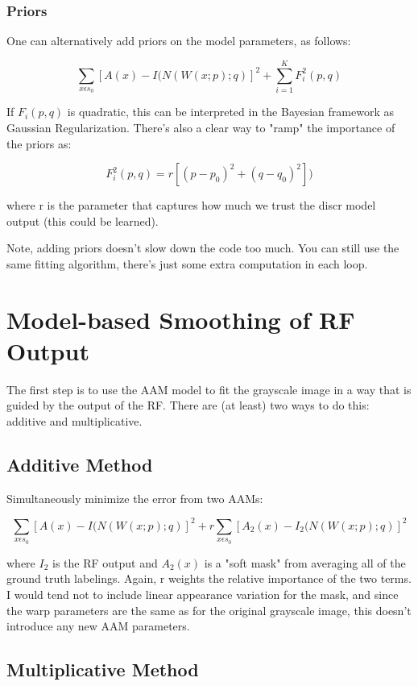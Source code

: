 \documentclass[10pt,twocolumn,letterpaper]{article}
\begin{document}
\subsubsection{Priors}

One can alternatively add priors on the model parameters, as follows:

\[ \sum_{x \epsilon s_0} [A(x) - I(N(W(x;p);q)]^2 + \sum_{i=1}^K F_i^2(p,q) \]

If $F_i(p,q)$ is quadratic, this can be interpreted in the Bayesian framework as Gaussian Regularization.  There's also a clear way to "ramp" the importance of the priors as:

\[ F_i^2(p,q) = r[(p-p_0)^2+(q-q_0)^2]) \]

where r is the parameter that captures how much we trust the discr model output (this could be learned).

Note, adding priors doesn't slow down the code too much.  You can still use the same fitting algorithm, there's just some extra computation in each loop.

\section{Model-based Smoothing of RF Output}

The first step is to use the AAM model to fit the grayscale image in a way that is guided by the output of the RF.  There are (at least) two ways to do this: additive and multiplicative.

\subsection{Additive Method}

Simultaneously minimize the error from two AAMs:

\[ \sum_{x \epsilon s_0} [A(x) - I(N(W(x;p);q)]^2 + r\sum_{x \epsilon s_0} [A_2(x) - I_2(N(W(x;p);q)]^2 \]

where $I_2$ is the RF output and $A_2(x)$ is a "soft mask" from averaging all of the ground truth labelings.  Again, r weights the relative importance of the two terms.  I would tend not to include linear appearance variation for the mask, and since the warp parameters are the same as for the original grayscale image, this doesn't introduce any new AAM parameters.

\subsection{Multiplicative Method}
\end{document}
